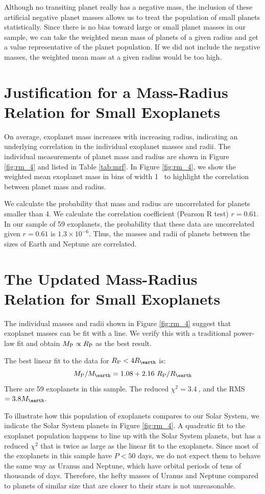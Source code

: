 \documentclass[11pt]{aastex}
\newcommand{\rspecial}{4 \rearth}
\newcommand{\chisquared}{3.4~}
\newcommand{\rms}{3.8 \mearth}
\begin{document}
Although no transiting planet really has a negative mass, the inclusion of these artificial negative planet masses allows us to treat the population of small planets statistically.  Since there is no bias toward large or small planet masses in our sample, we can take the weighted mean mass of planets of a given radius and get a value representative of the planet population.  If we did not include the negative masses, the weighted mean mass at a given radius would be too high.

\section{Justification for a Mass-Radius Relation for Small Exoplanets}
On average, exoplanet mass increases with increasing radius, indicating an underlying correlation in the individual exoplanet masses and radii.  The individual measurements of planet mass and radius are shown in Figure \ref{fig:rm_4} and listed in Table \ref{tab:mrf}.  In Figure \ref{fig:rm_4}, we show the weighted mean exoplanet mass in bins of width 1 \rearth\ to highlight the correlation between planet mass and radius.

We calculate the probability that mass and radius are uncorrelated for planets smaller than 4\rearth.  We calculate the correlation coefficient (Pearson R test) $r=0.61$.  In our sample of 59 exoplanets, the probability that these data are uncorrelated given $r = 0.61$ is $1.3 \times 10^{-6}$.  Thus, the masses and radii of planets between the sizes of Earth and Neptune are correlated.

\section{The Updated Mass-Radius Relation for Small Exoplanets}
The individual masses and radii shown in Figure \ref{fig:rm_4} suggest that exoplanet masses can be fit with a line.  We verify this with a traditional power-law fit and obtain $M_{\rm P} \propto R_{\rm P}$ as the best result.

The best linear fit to the data for $\rpl < \rspecial$ is:
$$
\mpl/\mearth = 1.08 +     2.16~\rpl/\rearth
$$
There are 59 exoplanets in this sample.  The reduced $\chi^2=\chisquared$, and the RMS $=\rms$.

To illustrate how this population of exoplanets compares to our Solar System, we indicate the Solar System planets in Figure \ref{fig:rm_4}.  A quadratic fit to the exoplanet population happens to line up with the Solar System planets, but has a reduced $\chi^2$ that is twice as large as the linear fit to the exoplanets.  Since most of the exoplanets in this sample have $P < 50$ days, we do not expect them to behave the same way as Uranus and Neptune, which have orbital periods of tens of thousands of days.  Therefore, the hefty masses of Uranus and Neptune compared to planets of similar size that are closer to their stars is not unreasonable.
\end{document}
